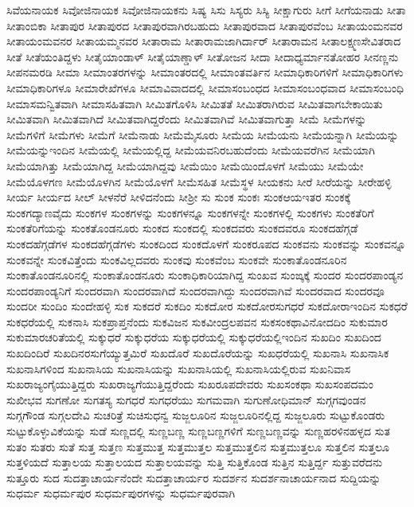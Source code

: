 {ಸಿವೆಯನಾಯಕ
ಸಿವೋಜಿನಾಯಕ
ಸಿವೋಜಿನಾಯಕನು
ಸಿಷ್ಯ
ಸಿಸು
ಸಿಸ್ಯರು
ಸಿಸ್ಯಿ
ಸೀಕ್ಷಾಗುರು
ಸೀಗೆ
ಸೀಗೆಯನಾಡು
ಸೀತಾ
ಸೀತಾಂಬಿಕಾ
ಸೀತಾಪುರ
ಸೀತಾಪುರದ
ಸೀತಾಪುರವಾಗಿರಬಹುದು
ಸೀತಾಪುರವಾದ
ಸೀತಾಪುರವೆಂಬ
ಸೀತಾಯಂಮನವರ
ಸೀತಾಯಂಮವನರ
ಸೀತಾಯಮ್ಮನವರ
ಸೀತಾರಾಮ
ಸೀತಾರಾಮಜಾಗಿರ್ದಾರ್
ಸೀತಾರಾಮನ
ಸೀತಾಲಕ್ಷ್ಮಣಸೇವಿತರಾದ
ಸೀತೆ
ಸೀತೆಯಂತಿದ್ದಳು
ಸೀತೈಯಾಂಡಾಳ್
ಸೀತೈಯಾಣ್ಡಾಳ್
ಸೀತೋಜನ
ಸೀದಾ
ಸೀದಾಧ್ಯರ್ಮಾನತೋಹರ
ಸೀನಣ್ಣನು
ಸೀಪನಮರಡಿ
ಸೀಮಾ
ಸೀಮಾಂತರಗಳನ್ನು
ಸೀಮಾಂತರದಲ್ಲಿ
ಸೀಮಾಂತವರ್ತಿನ
ಸೀಮಾಧಿಕಾರಿಗಳಿಗೆ
ಸೀಮಾಧಿಕಾರಿಗಳು
ಸೀಮಾಧಿಕಾರಿಗಳೂ
ಸೀಮಾರೇಖೆಗಳೂ
ಸೀಮಾವಿವಾದದಲ್ಲಿ
ಸೀಮಾಸಂಬಂಧದ
ಸೀಮಾಸಂಬಂಧವಾದ
ಸೀಮಾಸಂಬಂಧಿ
ಸೀಮಾಸಮನ್ವಿತವಾಗಿ
ಸೀಮಾಸಹಿತವಾಗಿ
ಸೀಮಿತಗೊಳಿಸಿ
ಸೀಮಿತತೆ
ಸೀಮಿತರಾಗಿರುವ
ಸೀಮಿತವಾಗಬೇಕಾಯಿತು
ಸೀಮಿತವಾಗಿ
ಸೀಮಿತವಾಗಿದೆ
ಸೀಮಿತವಾಗಿದ್ದರೆಂದು
ಸೀಮಿತವಾಗಿವೆ
ಸೀಮಿತವಾಗುತ್ತಾ
ಸೀಮೆ
ಸೀಮೆಗಳನ್ನು
ಸೀಮೆಗಳಿಗೆ
ಸೀಮೆಗಳು
ಸೀಮೆಗೆ
ಸೀಮೆನಾಡು
ಸೀಮೆಮೈಸೂರು
ಸೀಮೆಯ
ಸೀಮೆಯನು
ಸೀಮೆಯನ್ನಾಗಿ
ಸೀಮೆಯನ್ನು
ಸೀಮೆಯನ್ನುಇಂದಿನ
ಸೀಮೆಯಲ್ಲಿ
ಸೀಮೆಯಲ್ಲಿದ್ದ
ಸೀಮೆಯವನಿರಬಹುದೆಂದು
ಸೀಮೆಯವರೆಗಿನ
ಸೀಮೆಯಾಗಿ
ಸೀಮೆಯಾಗಿತ್ತು
ಸೀಮೆಯಾಗಿದ್ದ
ಸೀಮೆಯಾಗಿದ್ದವು
ಸೀಮೆಯಿಂ
ಸೀಮೆಯಿಂದೊಳಗೆ
ಸೀಮೆಯು
ಸೀಮೆಯೇ
ಸೀಮೆಯೊಳಗಣ
ಸೀಮೆಯೊಳಗಿನ
ಸೀಮೆಯೊಳಗೆ
ಸೀಮೆಸಹಿತ
ಸೀಮೆಸ್ಥಳ
ಸೀಯಕನು
ಸೀರೆ
ಸೀರೆಯನ್ನು
ಸೀರೇಹಳ್ಳಿ
ಸೀರ್ಯ
ಸೀರ್ಯದ
ಸೀಲ್
ಸೀಳನೆರೆ
ಸೀಳಿದನೆಂದು
ಸೀಶ್ರೀ
ಸು
ಸುಂಕ
ಸುಂಕಃ
ಸುಂಕಆಯಇತರ
ಸುಂಕಕ್ಕೆ
ಸುಂಕಗದ್ಯಾಣವೈದು
ಸುಂಕಗಳ
ಸುಂಕಗಳನ್ನು
ಸುಂಕಗಳನ್ನೂ
ಸುಂಕಗಳನ್ನೇ
ಸುಂಕಗಳಲ್ಲಿ
ಸುಂಕಗಳು
ಸುಂಕತೆರಿಗೆ
ಸುಂಕತೆರಿಗೆಯನ್ನು
ಸುಂಕತೊಂಡನೂರು
ಸುಂಕದ
ಸುಂಕದಲ್ಲಿ
ಸುಂಕದವರು
ಸುಂಕದವರೂ
ಸುಂಕದಹೆಗ್ಗಡೆ
ಸುಂಕದಹೆಗ್ಗಡೆಗಳ
ಸುಂಕದಹೆಗ್ಗಡೆಗಳು
ಸುಂಕದಿಂದ
ಸುಂಕದೊಳಗೆ
ಸುಂಕರೂಪದ
ಸುಂಕವನು
ಸುಂಕವನ್ನು
ಸುಂಕವನ್ನೂ
ಸುಂಕವನ್ನೇ
ಸುಂಕವಿತ್ತೆಂದು
ಸುಂಕವಿಲ್ಲದವರು
ಸುಂಕವು
ಸುಂಕವೆಂಬ
ಸುಂಕವೇ
ಸುಂಕಾತೊಂಡನೂರಿನ
ಸುಂಕಾತೊಂಡನೂರಿನಲ್ಲಿ
ಸುಂಕಾತೊಂಡನೂರು
ಸುಂಕಾಧಿಕಾರಿಯಾಗಿದ್ದ
ಸುಂಖವ
ಸುಂಙ್ಕಕ್ಕೆ
ಸುಂದರ
ಸುಂದರಪಾಂಡ್ಯನ
ಸುಂದರಪಾಂಡ್ಯನಿಗೆ
ಸುಂದರವಾಗಿ
ಸುಂದರವಾಗಿದೆ
ಸುಂದರವಾಗಿದ್ದು
ಸುಂದರವಾಗಿವೆ
ಸುಂದರವಾದ
ಸುಂದರವೂ
ಸುಂದರೀ
ಸುಂದಿಂ
ಸುಂದೇಹಳ್ಳಿ
ಸುಕ
ಸುಕದರೆ
ಸುಕದಿಂ
ಸುಕದೋರ
ಸುಕದೋರಸುಗಧರೆ
ಸುಕದೋರಾಇಂದಿನ
ಸುಕಧರೆ
ಸುಕಧರೆಯಲ್ಲಿ
ಸುಕನಾಸಿ
ಸುಕಪ್ರಾಪ್ತನೆಂದು
ಸುಕವಿಜನ
ಸುಕವೀಂದ್ರಲಪವನ
ಸುಕಸಂಕಥಾವಿನೋದದಿಂ
ಸುಕುಮಾರ
ಸುಕುಮಾರಚರಿತೆಯಲ್ಲಿ
ಸುಕ್ಕುಧರೆ
ಸುಕ್ಕುಧರೆಯ
ಸುಕ್ಕುಧರೆಯಲ್ಲಿ
ಸುಕ್ಕುಧರೆಯಲ್ಲಿಇಂದಿನ
ಸುಖದಿಂ
ಸುಖದಿಂದ
ಸುಖದಿಂದಿರೆ
ಸುಖದಿನರಸುಗೆಯ್ಯುತ್ತಮಿರೆ
ಸುಖದೊರೆ
ಸುಖದೊರೆಯನ್ನು
ಸುಖಧರೆಯಲ್ಲಿ
ಸುಖನಾಸಿ
ಸುಖನಾಸಿಕ
ಸುಖನಾಸಿಗಳಿಂದ
ಸುಖನಾಸಿಯ
ಸುಖನಾಸಿಯನ್ನು
ಸುಖನಾಸಿಯಲ್ಲಿ
ಸುಖನಾಸಿಯಲ್ಲಿರುವ
ಸುಖನಿವಾಸ
ಸುಖರಾಜ್ಯಂಗೈಯುತ್ತಿದ್ದರು
ಸುಖರಾಜ್ಯಗೆಯುತ್ತಿದ್ದರೆಂದು
ಸುಖರೂಪದೇವರು
ಸುಖಸಂಕಥಾ
ಸುಖಸಂಪದಮಂ
ಸುಖೀಭವ
ಸುಗಣೋ
ಸುಗತಸ್ಯ
ಸುಗಧರೆ
ಸುಗಧರೆಯು
ಸುಗಮವಾಗಿ
ಸುಗುಣೋಧಿಮಾನ್
ಸುಗ್ಗಗವುಂಡನ
ಸುಗ್ಗಗೌಂಡ
ಸುಗ್ಗಲದೇವಿ
ಸುಚರಿತ್ರೆ
ಸುಚಿಸುಧನ್ವ
ಸುಜ್ಜಲೂರಿನ
ಸುಜ್ಜಲೂರಿನಲ್ಲಿದ್ದ
ಸುಜ್ಜಲೂರು
ಸುಟ್ಟುಕೊಂಡರು
ಸುಟ್ಟುಕೊಳ್ಳುವಿಕೆಯನ್ನು
ಸುಡೆ
ಸುಣ್ಣದಲ್ಲಿ
ಸುಣ್ಣಬಣ್ಣ
ಸುಣ್ಣಬಣ್ಣಗಳಿಗೆ
ಸುಣ್ಣಬಣ್ಣವನ್ನು
ಸುಣ್ಣಹರಳಿನಹಳ್ಳದ
ಸುತ
ಸುತಂ
ಸುತರು
ಸುತೆ
ಸುತ್ತ
ಸುತ್ತಣ
ಸುತ್ತಮುತ್ತ
ಸುತ್ತಮುತ್ತಲ
ಸುತ್ತಮುತ್ತಲಿನ
ಸುತ್ತಮುತ್ತಲೂ
ಸುತ್ತಲಿನ
ಸುತ್ತಲೂ
ಸುತ್ತಳಿಯದೆ
ಸುತ್ತಾಲಯ
ಸುತ್ತಾಲಯದ
ಸುತ್ತಾಲಯವನ್ನು
ಸುತ್ತಿ
ಸುತ್ತಿಕೊಂಡ
ಸುತ್ತಿನ
ಸುತ್ತಿರ್ದ್ದ
ಸುತ್ತುವರೆದನು
ಸುತ್ತೂರು
ಸುದ
ಸುದತ್ತಾಚಾರ್ಯನೆಂದೇ
ಸುದತ್ತಾಚಾರ್ಯರ
ಸುದರ್ಶನ
ಸುದರ್ಶನಾಚಾರ್ಯನಾದ
ಸುದ್ದಿಯನ್ನು
ಸುಧರ್ಮ
ಸುಧರ್ಮಪುರ
ಸುಧರ್ಮಪುರಗಳನ್ನು
ಸುಧರ್ಮಪುರವಾಗಿ
}
